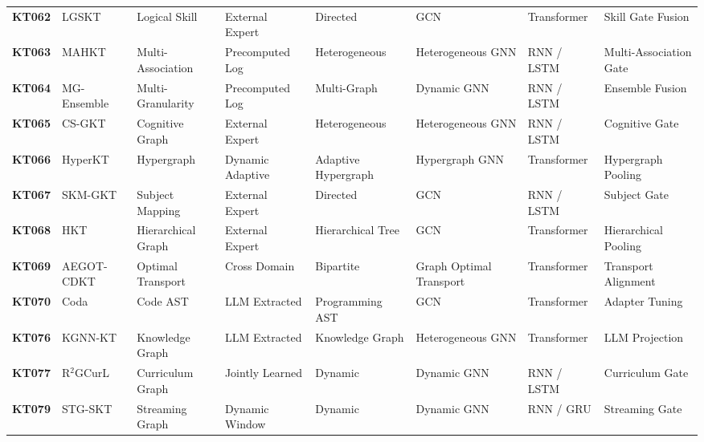 \documentclass[10pt,journal,compsoc]{IEEEtran}
\begin{document}
\begin{table}[t]
{\begin{tabular}{@{}l l l l l l l l@{}}
\textbf{KT062} & LGSKT \cite{KT062_LGSKT_2025} & Logical Skill & External Expert & Directed & GCN & Transformer & Skill Gate Fusion \\
\textbf{KT063} & MAHKT \cite{KT063_MAHKT_2025} & Multi-Association & Precomputed Log & Heterogeneous & Heterogeneous GNN & RNN / LSTM & Multi-Association Gate \\
\textbf{KT064} & MG-Ensemble \cite{KT064_MGEnsemble_2025} & Multi-Granularity & Precomputed Log & Multi-Graph & Dynamic GNN & RNN / LSTM & Ensemble Fusion \\
\textbf{KT065} & CS-GKT \cite{KT065_CSGKT_2025} & Cognitive Graph & External Expert & Heterogeneous & Heterogeneous GNN & RNN / LSTM & Cognitive Gate \\
\textbf{KT066} & HyperKT \cite{KT066_HyperKT_2025} & Hypergraph & Dynamic Adaptive & Adaptive Hypergraph & Hypergraph GNN & Transformer & Hypergraph Pooling \\
\textbf{KT067} & SKM-GKT \cite{KT067_SKMGKT_2025} & Subject Mapping & External Expert & Directed & GCN & RNN / LSTM & Subject Gate \\
\textbf{KT068} & HKT \cite{KT068_HKT_2025} & Hierarchical Graph & External Expert & Hierarchical Tree & GCN & Transformer & Hierarchical Pooling \\
\textbf{KT069} & AEGOT-CDKT \cite{KT069_AEGOTCDKT_2025} & Optimal Transport & Cross Domain & Bipartite & Graph Optimal Transport & Transformer & Transport Alignment \\
\textbf{KT070} & Coda \cite{KT070_Coda_2025} & Code AST & LLM Extracted & Programming AST & GCN & Transformer & Adapter Tuning \\
\textbf{KT076} & KGNN-KT \cite{KT076_KGNNKT_2025} & Knowledge Graph & LLM Extracted & Knowledge Graph & Heterogeneous GNN & Transformer & LLM Projection \\
\textbf{KT077} & R$^2$GCurL \cite{KT077_R2GCurL_2026} & Curriculum Graph & Jointly Learned & Dynamic & Dynamic GNN & RNN / LSTM & Curriculum Gate \\
\textbf{KT079} & STG-SKT \cite{KT079_STGSKT_2026} & Streaming Graph & Dynamic Window & Dynamic & Dynamic GNN & RNN / GRU & Streaming Gate \\
\bottomrule
\end{tabular}
}
\end{table}
\end{document}
